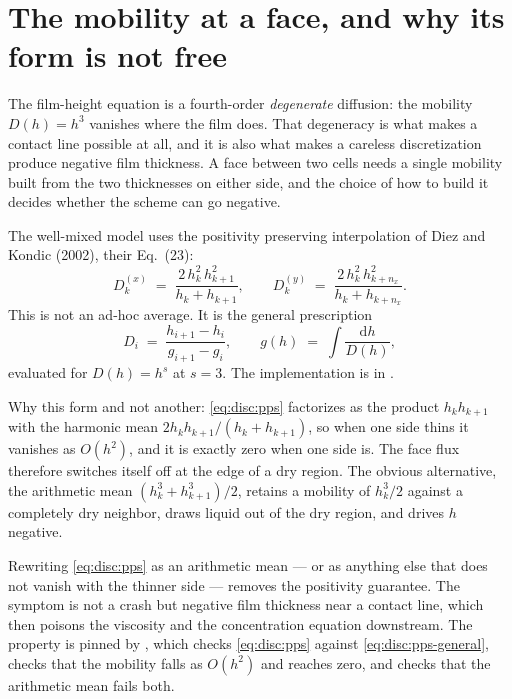 \section{The mobility at a face, and why its form is not free}
\label{sec:disc:positivity}

The film-height equation is a fourth-order \emph{degenerate} diffusion: the
mobility $D(h) = h^{3}$ vanishes where the film does. That degeneracy is what
makes a contact line possible at all, and it is also what makes a careless
discretization produce negative film thickness. A face between two cells needs
a single mobility built from the two thicknesses on either side, and the choice
of how to build it decides whether the scheme can go negative.

The well-mixed model uses the positivity preserving interpolation of Diez and
Kondic (2002), their Eq.~(23):
%
\begin{equation}
  D_{k}^{(x)} \;=\; \frac{2\,h_{k}^{2}\,h_{k+1}^{2}}{h_{k} + h_{k+1}},
  \qquad
  D_{k}^{(y)} \;=\; \frac{2\,h_{k}^{2}\,h_{k+n_x}^{2}}{h_{k} + h_{k+n_x}} .
  \label{eq:disc:pps}
\end{equation}
%
This is not an ad-hoc average. It is the general prescription
%
\begin{equation}
  D_{i} \;=\; \frac{h_{i+1} - h_{i}}{g_{i+1} - g_{i}},
  \qquad
  g(h) \;=\; \int \frac{\mathrm{d}h}{D(h)} ,
  \label{eq:disc:pps-general}
\end{equation}
%
evaluated for $D(h) = h^{s}$ at $s = 3$. The implementation is
 in .

Why this form and not another: \cref{eq:disc:pps} factorizes as the product
$h_k h_{k+1}$ with the harmonic mean $2h_k h_{k+1}/(h_k + h_{k+1})$, so when one
side thins it vanishes as $O(h^{2})$, and it is exactly zero when one side is.
The face flux therefore switches itself off at the edge of a dry region. The
obvious alternative, the arithmetic mean $(h_k^{3} + h_{k+1}^{3})/2$, retains a
mobility of $h_k^{3}/2$ against a completely dry neighbor, draws liquid out of
the dry region, and drives $h$ negative.

\begin{warn}
Rewriting \cref{eq:disc:pps} as an arithmetic mean --- or as anything else that
does not vanish with the thinner side --- removes the positivity guarantee. The
symptom is not a crash but negative film thickness near a contact line, which
then poisons the viscosity and the concentration equation downstream. The
property is pinned by
, which checks
\cref{eq:disc:pps} against \cref{eq:disc:pps-general}, checks that the mobility
falls as $O(h^{2})$ and reaches zero, and checks that the arithmetic mean fails
both.
\end{warn}

